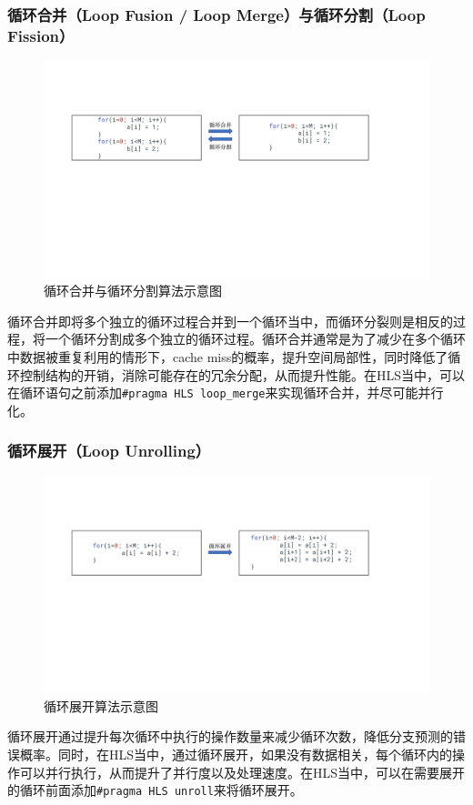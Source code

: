 \subsubsection{循环合并（Loop Fusion / Loop Merge）与循环分割（Loop Fission）}
\begin{figure}[htbp]
    \centering
    \includegraphics[width=\linewidth]{figures/loop fusion.pdf}
    \caption{循环合并与循环分割算法示意图}
    \label{fig:loop_fusion}
\end{figure}
循环合并即将多个独立的循环过程合并到一个循环当中，而循环分裂则是相反的过程，将一个循环分割成多个独立的循环过程。循环合并通常是为了减少在多个循环中数据被重复利用的情形下，cache miss的概率，提升空间局部性，同时降低了循环控制结构的开销，消除可能存在的冗余分配，从而提升性能。在HLS当中，可以在循环语句之前添加\verb|#pragma HLS loop_merge|来实现循环合并，并尽可能并行化。
\subsubsection{循环展开（Loop Unrolling）}
\begin{figure}[htbp]
    \centering
    \includegraphics[width=\linewidth]{figures/loop unrolling.pdf}
    \caption{循环展开算法示意图}
    \label{fig:loop_unrolling}
\end{figure}
循环展开通过提升每次循环中执行的操作数量来减少循环次数，降低分支预测的错误概率。同时，在HLS当中，通过循环展开，如果没有数据相关，每个循环内的操作可以并行执行，从而提升了并行度以及处理速度。在HLS当中，可以在需要展开的循环前面添加\verb|#pragma HLS unroll|来将循环展开。

